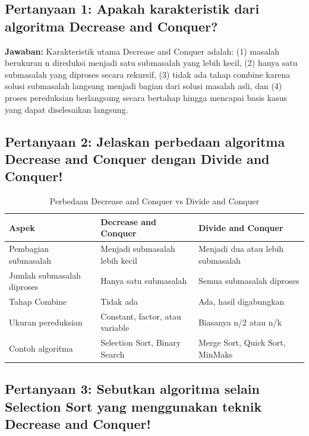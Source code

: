 \subsection*{Pertanyaan 1: Apakah karakteristik dari algoritma Decrease and Conquer?}

\textbf{Jawaban:} Karakteristik utama Decrease and Conquer adalah: (1) masalah berukuran n direduksi menjadi satu submasalah yang lebih kecil, (2) hanya satu submasalah yang diproses secara rekursif, (3) tidak ada tahap combine karena solusi submasalah langsung menjadi bagian dari solusi masalah asli, dan (4) proses pereduksian berlangsung secara bertahap hingga mencapai basis kasus yang dapat diselesaikan langsung.

\subsection*{Pertanyaan 2: Jelaskan perbedaan algoritma Decrease and Conquer dengan Divide and Conquer!}

\begin{table}[H]
    \centering
    \caption{Perbedaan Decrease and Conquer vs Divide and Conquer}
    \begin{tabular}{p{4.5cm}p{5cm}p{5cm}}
    \toprule
    \textbf{Aspek} & \textbf{Decrease and Conquer} & \textbf{Divide and Conquer} \\ \midrule
    Pembagian submasalah & Menjadi submasalah lebih kecil & Menjadi dua atau lebih submasalah \\
    Jumlah submasalah diproses & Hanya satu submasalah & Semua submasalah diproses \\
    Tahap Combine & Tidak ada & Ada, hasil digabungkan \\
    Ukuran pereduksian & Constant, factor, atau variable & Biasanya n/2 atau n/k \\
    Contoh algoritma & Selection Sort, Binary Search & Merge Sort, Quick Sort, MinMaks \\ \bottomrule
    \end{tabular}
\end{table}

\subsection*{Pertanyaan 3: Sebutkan algoritma selain Selection Sort yang menggunakan teknik Decrease and Conquer!}

